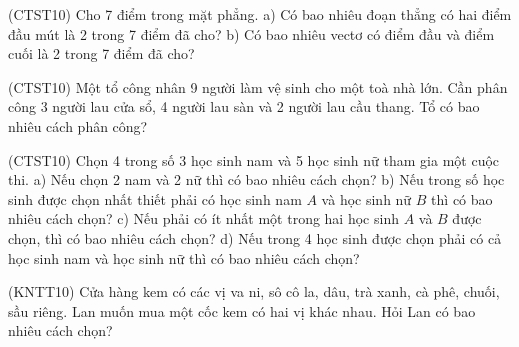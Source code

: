 \documentclass[12pt,a4paper]{article}
\begin{document}
\begin{ex}
(CTST10) Cho 7 điểm trong mặt phẳng.
a) Có bao nhiêu đoạn thẳng có hai điểm đầu mút là 2 trong 7 điểm đã cho?
b) Có bao nhiêu vectơ có điểm đầu và điểm cuối là 2 trong 7 điểm đã cho?
\end{ex}

\begin{ex}
(CTST10) Một tổ công nhân 9 người làm vệ sinh cho một toà nhà lớn. Cần phân công 3 người lau cửa sổ, 4 người lau sàn và 2 người lau cầu thang. Tổ có bao nhiêu cách phân công?
\end{ex}

\begin{ex}
(CTST10) Chọn 4 trong số 3 học sinh nam và 5 học sinh nữ tham gia một cuộc thi.
a) Nếu chọn 2 nam và 2 nữ thì có bao nhiêu cách chọn?
b) Nếu trong số học sinh được chọn nhất thiết phải có học sinh nam $A$ và học sinh nữ $B$ thì có bao nhiêu cách chọn?
c) Nếu phải có ít nhất một trong hai học sinh $A$ và $B$ được chọn, thì có bao nhiêu cách chọn?
d) Nếu trong 4 học sinh được chọn phải có cả học sinh nam và học sinh nữ thì có bao nhiêu cách chọn?
\end{ex}

\begin{ex}
(KNTT10) Cửa hàng kem có các vị va ni, sô cô la, dâu, trà xanh, cà phê, chuối, sầu riêng. Lan muốn mua một cốc kem có hai vị khác nhau. Hỏi Lan có bao nhiêu cách chọn?
\end{ex}
\end{document}
